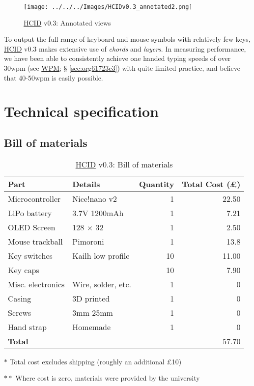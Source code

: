 \documentclass[logo,bsc,singlespacing,parskip]{infthesis}
\begin{document}
\begin{figure}[h]
\centering
\texttt{[image: ../../../Images/HCIDv0.3\_annotated2.png]}
\caption{\hyperref[org0c83164]{HCID} v0.3: Annotated views}
\end{figure}

To output the full range of keyboard and mouse symbols with relatively few keys, \hyperref[org0c83164]{HCID} v0.3 makes extensive use of \emph{chords} and \emph{layers}. In measuring performance, we have been able to consistently achieve one handed typing speeds of over 30wpm (see \hyperref[sec:org61723c3]{WPM}; § \ref{sec:org61723c3}) with quite limited practice, and believe that 40-50wpm is easily possible.
\section{Technical specification}
\label{sec:org1ae83cb}
\subsection{Bill of materials}
\label{sec:org64ba466}
\begin{table}
\begin{threeparttable}
\begin{tabular}{llrr}
\toprule
\textbf{Part} & \textbf{Details} & \textbf{Quantity} & \textbf{Total Cost (£)}\\
\midrule
Microcontroller & Nice!nano v2 \autocite{NiceNanoNice} & 1 & 22.50\\
LiPo battery & 3.7V 1200mAh \autocite{adafruitLiPo} & 1 & 7.21\\
OLED Screen & 128 \(\times\) 32 \autocite{128X32OLEDScreen} & 1 & 2.50\\
Mouse trackball & Pimoroni \autocite{TrackballBreakoutPimoroni} & 1 & 13.8\\
Key switches & Kailh low profile \autocite{Mechboards} & 10 & 11.00\\
Key caps & \autocite{Mechboards} & 10 & 7.90\\
Misc. electronics & Wire, solder, etc. & 1 & 0\\
Casing & 3D printed & 1 & 0\\
Screws & 3mm \texttimes{} 25mm & 1 & 0\\
Hand strap & Homemade & 1 & 0\\
\midrule
\textbf{Total} &  &  & 57.70\\
\bottomrule
\end{tabular}
\begin{tablenotes}
\item[] \(\ast\) Total cost excludes shipping (roughly an additional £10)
\item[] \(\ast \ast\) Where cost is zero, materials were provided by the university
\end{tablenotes}
\caption{\label{tab:bom}\hyperref[org0c83164]{HCID} v0.3: Bill of materials}
\end{threeparttable}
\end{table}
\end{document}
